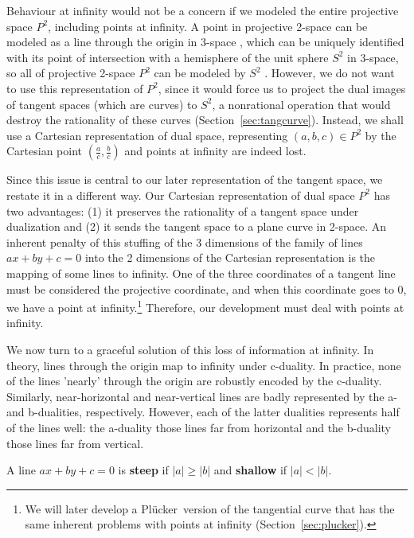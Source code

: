 \documentclass[12pt]{article}
\newcommand{\plucker}{Pl\"{u}cker\ }
\begin{document}
Behaviour at infinity would not be a concern if we modeled
the entire projective space $P^2$, including points at infinity.
A point in projective 2-space can be modeled as a line through the
origin in 3-space \cite{foley96}, which can be uniquely identified with its
point of intersection with a hemisphere of the unit sphere $S^2$ in 3-space,
so all of projective 2-space $P^2$ can be modeled by $S^2$ \cite{zorin00}.
However, we do not want to use this representation of $P^2$,
since it would force us to project 
the dual images of tangent spaces (which are curves)
to $S^2$, a nonrational operation that would destroy the rationality
of these curves (Section~\ref{sec:tangcurve}).
Instead, we shall use a Cartesian representation of dual space, 
representing $(a,b,c) \in P^2$ by the Cartesian point $(\frac{a}{c},\frac{b}{c})$
and points at infinity are indeed lost.

Since this issue is central to our later representation
of the tangent space, we restate it in a different way.
Our Cartesian representation of dual space $P^2$ has two advantages:
(1) it preserves the rationality of a tangent space under dualization and
(2) it sends the tangent space to a plane curve in 2-space.
An inherent penalty of this
stuffing of the 3 dimensions of the family of lines $ax+by+c=0$
into the 2 dimensions of the Cartesian representation
is the mapping of some lines to infinity.
One of the three coordinates of a tangent line must be considered the 
projective coordinate, and
when this coordinate goes to 0, we have a point at infinity.\footnote{We
	will later develop a \plucker version of the 
	tangential curve that has the same inherent problems with points at infinity 
	(Section~\ref{sec:plucker}).}
Therefore, our development must deal with points at infinity.

We now turn to a graceful solution of this loss of information at infinity.
In theory, lines through the origin map to infinity under c-duality.
In practice, none of the lines 'nearly' through the origin 
are robustly encoded by the c-duality.
Similarly, near-horizontal and near-vertical lines 
are badly represented by the a- and b-dualities, respectively.
However, each of the latter dualities represents half of the lines well:
the a-duality those lines far from horizontal and
the b-duality those lines far from vertical.

\begin{defn2}
\label{defn:steep}
A line $ax+by+c=0$ is {\bf steep} if $|a| \geq |b|$
and {\bf shallow} if $|a| < |b|$.
\end{defn2}
\end{document}
